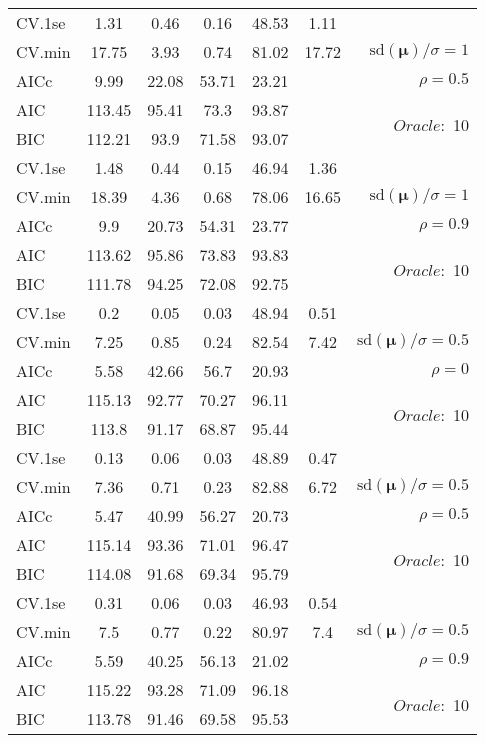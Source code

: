 \begin{table}
\begin{center}
\begin{tabular}{l*{5}{c}|r}
 \hline 
CV.1se & 1.31 & 0.46 & 0.16 & 48.53 & 1.11 & \\
CV.min & 17.75 & 3.93 & 0.74 & 81.02 & 17.72 &  $\mathrm{sd}(\mathbf{\mu})/\sigma=1$ \\
AICc & 9.99 & 22.08 & 53.71 & 23.21 & & $\rho=0.5$ \\
AIC & 113.45 & 95.41 & 73.3 & 93.87 & &  \multirow{2}{*}{$Oracle: $ 10} \\
BIC & 112.21 & 93.9 & 71.58 & 93.07 & &  \\
 \hline 
CV.1se & 1.48 & 0.44 & 0.15 & 46.94 & 1.36 & \\
CV.min & 18.39 & 4.36 & 0.68 & 78.06 & 16.65 &  $\mathrm{sd}(\mathbf{\mu})/\sigma=1$ \\
AICc & 9.9 & 20.73 & 54.31 & 23.77 & & $\rho=0.9$ \\
AIC & 113.62 & 95.86 & 73.83 & 93.83 & &  \multirow{2}{*}{$Oracle: $ 10} \\
BIC & 111.78 & 94.25 & 72.08 & 92.75 & &  \\
 \hline 
CV.1se & 0.2 & 0.05 & 0.03 & 48.94 & 0.51 & \\
CV.min & 7.25 & 0.85 & 0.24 & 82.54 & 7.42 &  $\mathrm{sd}(\mathbf{\mu})/\sigma=0.5$ \\
AICc & 5.58 & 42.66 & 56.7 & 20.93 & & $\rho=0$ \\
AIC & 115.13 & 92.77 & 70.27 & 96.11 & &  \multirow{2}{*}{$Oracle: $ 10} \\
BIC & 113.8 & 91.17 & 68.87 & 95.44 & &  \\
 \hline 
CV.1se & 0.13 & 0.06 & 0.03 & 48.89 & 0.47 & \\
CV.min & 7.36 & 0.71 & 0.23 & 82.88 & 6.72 &  $\mathrm{sd}(\mathbf{\mu})/\sigma=0.5$ \\
AICc & 5.47 & 40.99 & 56.27 & 20.73 & & $\rho=0.5$ \\
AIC & 115.14 & 93.36 & 71.01 & 96.47 & &  \multirow{2}{*}{$Oracle: $ 10} \\
BIC & 114.08 & 91.68 & 69.34 & 95.79 & &  \\
 \hline 
CV.1se & 0.31 & 0.06 & 0.03 & 46.93 & 0.54 & \\
CV.min & 7.5 & 0.77 & 0.22 & 80.97 & 7.4 &  $\mathrm{sd}(\mathbf{\mu})/\sigma=0.5$ \\
AICc & 5.59 & 40.25 & 56.13 & 21.02 & & $\rho=0.9$ \\
AIC & 115.22 & 93.28 & 71.09 & 96.18 & &  \multirow{2}{*}{$Oracle: $ 10} \\
BIC & 113.78 & 91.46 & 69.58 & 95.53 & &  \\
 \hline 
\end{tabular}
\end{center}
\vspace{-1cm}
\end{table}




